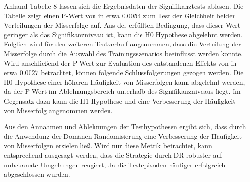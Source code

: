 Anhand Tabelle 8 lassen sich die Ergebnisdaten der Signifikanztests ablesen.
Die Tabelle zeigt einen P-Wert von in etwa $0.0054$ zum Test der Gleichheit beider Verteilungen der Misserfolge auf.
Aus der erfüllten Bedingung, dass dieser Wert geringer als das Signifikanzniveau ist, kann die H0 Hypothese abgelehnt werden.
Folglich wird für den weiteren Testverlauf angenommen, dass die Verteilung der Misserfolge durch die Auswahl des Trainingsszenarios beeinflusst werden konnte.
Wird anschließend der P-Wert zur Evaluation des entstandenen Effekts von in etwa $0.0027$ betrachtet, können folgende Schlussfolgerungen gezogen werden.
Die H0 Hypothese einer höheren Häufigkeit von Misserfolgen kann abgelehnt werden, da der P-Wert im Ablehnungsbereich unterhalb des Signifikanzniveaus liegt.
Im Gegensatz dazu kann die H1 Hypothese und eine Verbesserung der Häufigkeit von Misserfolg angenommen werden.

Aus den Annahmen und Ablehnungen der Testhypothesen ergibt sich, dass durch die Anwendung der Domänen Randomisierung eine Verbesserung der Häufigkeit von Misserfolgen erzielen ließ.
Wird nur diese Metrik betrachtet, kann entsprechend ausgesagt werden, dass die Strategie durch DR robuster auf unbekannte Umgebungen reagiert, da die Testepisoden häufiger erfolgreich abgeschlossen wurden.